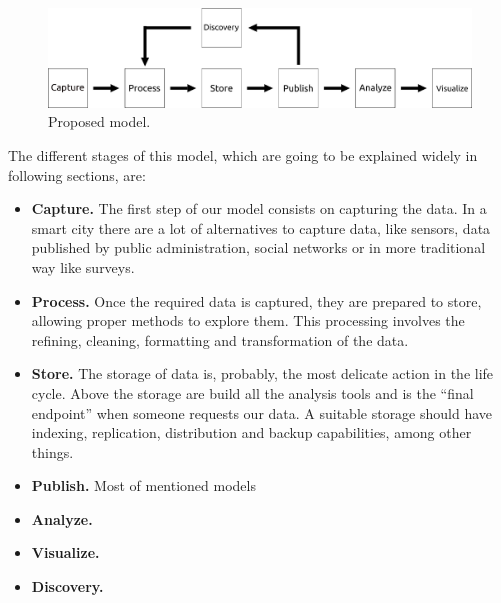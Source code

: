 \begin{figure}
    \center
    \includegraphics[width=\linewidth]{img/data_lifecycle/model.pdf}
    \caption{Proposed model.}
    \label{fig:model}
\end{figure}

The different stages of this model, which are going to be explained widely in following sections, are:
\begin{itemize}
    \item \textbf{Capture.} The first step of our model consists on capturing the data. In a smart city there are a lot of alternatives to capture data, like sensors, data published by public administration, social networks or in more traditional way like surveys.
    \item \textbf{Process.} Once the required data is captured, they are prepared to store, allowing proper methods to explore them. This processing involves the refining, cleaning, formatting and transformation of the data.
    \item \textbf{Store.} The storage of data is, probably, the most delicate action in the life cycle. Above the storage are build all the analysis tools and is the ``final endpoint'' when someone requests our data. A suitable storage should have indexing, replication, distribution and backup capabilities, among other things.
    \item \textbf{Publish.} Most of mentioned models 
    \item \textbf{Analyze.}
    \item \textbf{Visualize.}
    \item \textbf{Discovery.}
\end{itemize}

